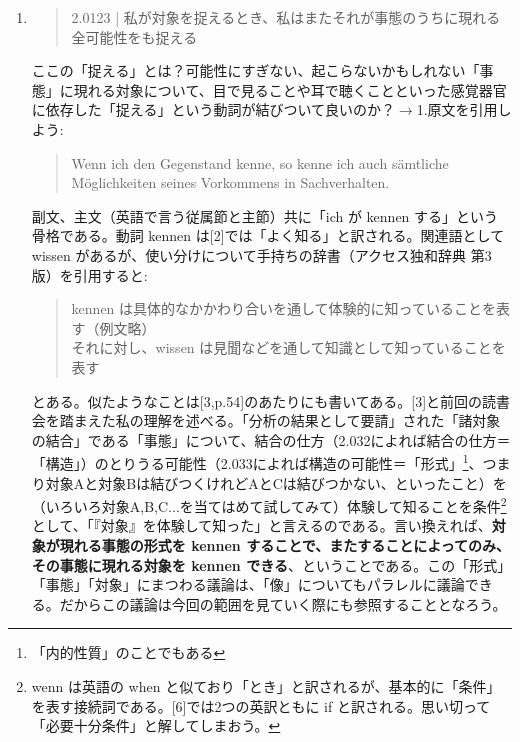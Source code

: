 \documentclass[11pt,a4paper]{jsarticle}
\begin{document}
\begin{enumerate}
\item \label{kennen}
\begin{quote}2.0123 | 私が対象を捉えるとき、私はまたそれが事態のうちに現れる全可能性をも捉える
\end{quote}
ここの「捉える」とは？可能性にすぎない、起こらないかもしれない「事態」に現れる対象について、目で見ることや耳で聴くことといった感覚器官に依存した「捉える」という動詞が結びついて良いのか？$\rightarrow$1.原文を引用しよう:
\begin{quote}
Wenn ich den Gegenstand kenne, so kenne ich auch s\"amtliche M\"oglichkeiten seines Vorkommens in Sachverhalten.
\end{quote}
副文、主文（英語で言う従属節と主節）共に「ich が kennen する」という骨格である。動詞 kennen は[2]では「よく知る」と訳される。関連語として wissen があるが、使い分けについて手持ちの辞書（アクセス独和辞典 第3版）を引用すると:
\begin{quote}
kennen は具体的なかかわり合いを通して体験的に知っていることを表す（例文略） \\
それに対し、wissen は見聞などを通して知識として知っていることを表す
\end{quote}
とある。似たようなことは[3,p.54]のあたりにも書いてある。[3]と前回の読書会を踏まえた私の理解を述べる。「分析の結果として要請」された「諸対象の結合」である「事態」について、結合の仕方（2.032によれば結合の仕方＝「構造」）のとりうる可能性（2.033によれば構造の可能性＝「形式」\footnote{「内的性質」のことでもある}、つまり対象Aと対象Bは結びつくけれどAとCは結びつかない、といったこと）を（いろいろ対象A,B,C...を当てはめて試してみて）体験して知ることを条件\footnote{wenn は英語の when と似ており「とき」と訳されるが、基本的に「条件」を表す接続詞である。[6]では2つの英訳ともに if と訳される。思い切って「必要十分条件」と解してしまおう。}として、「『対象』を体験して知った」と言えるのである。言い換えれば、{\bf 対象が現れる事態の形式を kennen することで、またすることによってのみ、その事態に現れる対象を kennen できる}、ということである。この「形式」「事態」「対象」にまつわる議論は、「像」についてもパラレルに議論できる。だからこの議論は今回の範囲を見ていく際にも参照することとなろう。


\end{enumerate}
\end{document}
